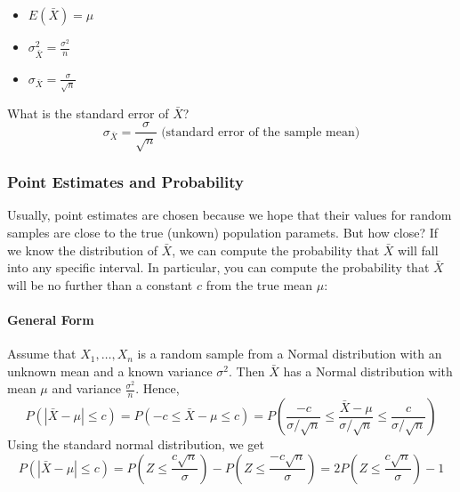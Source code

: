 \begin{itemize}
		\item $E(\bar{X}) = \mu$
		\item $\sigma^2_{\bar{X}} = \frac{\sigma^2}{n}$
		\item $\sigma_{\bar{X}} = \frac{\sigma}{\sqrt{n}}$
\end{itemize}

What is the standard error of $\bar{X}$?
\[\sigma_{\bar{X}} = \frac{\sigma}{\sqrt{n}} \text{ (standard error of the sample mean)}\]

\subsubsection*{Point Estimates and Probability}
Usually, point estimates are chosen because we hope that their values for random samples are close to the 
true (unkown) population paramets. But how close? If we know the distribution of $\bar{X}$,
we can compute the probability that $\bar{X}$ will fall into any specific interval.
In particular, you can compute the probability that $\bar{X}$ will be no further than a constant $c$
from the true mean $\mu$:

\paragraph*{General Form}
Assume that $X_1, \dots, X_n$ is a random sample from a Normal distribution with an unknown mean and
a known variance $\sigma^2$. Then $\bar{X}$ has a Normal distribution with mean $\mu$ and variance $\frac{\sigma^2}{n}$.
Hence,
\[P(|\bar{X} - \mu| \leq c) = P\left(-c \leq \bar{X} - \mu \leq c\right) = P\left(\frac{-c}{\sigma / \sqrt{n}} \leq \frac{\bar{X} - \mu}{\sigma / \sqrt{n}} \leq \frac{c}{\sigma / \sqrt{n}}\right)\]
Using the standard normal distribution, we get
\[P(|\bar{X} - \mu| \leq c) = P\left(Z \leq \frac{c \sqrt{n}}{\sigma}\right) - P\left(Z \leq \frac{-c \sqrt{n}}{\sigma}\right) = 2 P\left(Z \leq \frac{c \sqrt{n}}{\sigma}\right) - 1\]